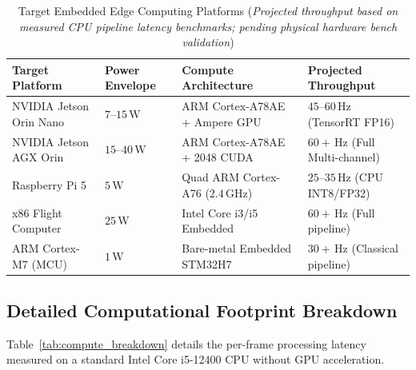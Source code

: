 \documentclass[11pt,a4paper]{article}
\begin{document}
\begin{table}[htbp]
\centering
\small
\caption{Target Embedded Edge Computing Platforms (\textit{Projected throughput based on measured CPU pipeline latency benchmarks; pending physical hardware bench validation})}
\label{tab:hardware_platforms}
\begin{tabularx}{\linewidth}{@{}p{4.8cm} p{2.5cm} X p{3.2cm}@{}}
\toprule
\textbf{Target Platform} & \textbf{Power Envelope} & \textbf{Compute Architecture} & \textbf{Projected Throughput} \\
\midrule
NVIDIA Jetson Orin Nano   & $7$--$15\,\text{W}$    & ARM Cortex-A78AE + Ampere GPU  & $45$--$60\,\text{Hz}$ (TensorRT FP16) \\
NVIDIA Jetson AGX Orin   & $15$--$40\,\text{W}$   & ARM Cortex-A78AE + 2048 CUDA   & $60+\,\text{Hz}$ (Full Multi-channel) \\
Raspberry Pi 5           & $5\,\text{W}$          & Quad ARM Cortex-A76 ($2.4\,\text{GHz}$) & $25$--$35\,\text{Hz}$ (CPU INT8/FP32) \\
x86 Flight Computer      & $25\,\text{W}$         & Intel Core i3/i5 Embedded      & $60+\,\text{Hz}$ (Full pipeline) \\
ARM Cortex-M7 (MCU)      & $1\,\text{W}$          & Bare-metal Embedded STM32H7    & $30+\,\text{Hz}$ (Classical pipeline) \\
\bottomrule
\end{tabularx}
\end{table}

\subsection{Detailed Computational Footprint Breakdown}
Table~\ref{tab:compute_breakdown} details the per-frame processing latency measured on a standard Intel Core i5-12400 CPU without GPU acceleration.
\end{document}
